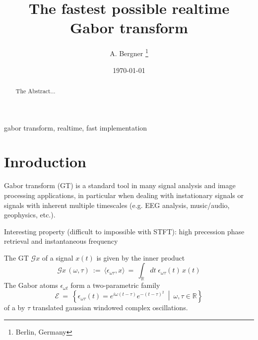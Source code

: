\documentclass[journal]{IEEEtran}
\begin{document}
\title {The fastest possible realtime Gabor transform}
\author{A. Bergner \thanks{Berlin, Germany} }
\date  {\today}
\maketitle




\begin{abstract}

The Abstract...

\end{abstract}

\begin{IEEEkeywords}
  gabor transform, realtime, fast implementation
\end{IEEEkeywords}





  \section{Inroduction}
  \label{sec:intro}


 Gabor transform (GT) is a standard tool in many signal
analysis and image processing applications, in particular when dealing with
instationary signals or signals with inherent multiple timescales (e.g. EEG
analysis, music/audio, geophysics, etc.).

Interesting property (difficult to impossible with STFT):  high precession phase retrieval and instantaneous frequency



The GT $\mathcal{G}x$ of a signal $x(t)$ is given by the inner product
\begin{equation} \label{def:GT}
  \mathcal{G}x\,(\omega,\tau) \ := \ \langle \epsilon_{\omega\tau} , x \rangle
    \ = \ \int_{\mathbb R}\!\! dt \; \epsilon_{\omega\tau} (t)\, x(t)
\end{equation}
The Gabor atoms $\epsilon_{\omega t}$ form a two-parametric family
\begin{equation}
  \mathcal{E} \ = \ \left\{ \epsilon_{\omega\tau}(t) =  e^{i\omega (t-\tau)} e^{-(t-\tau)^2}
                      \ \middle| \   \omega,\tau \in \mathbb{R} \right\}
\end{equation}
of a by $\tau$ translated gaussian windowed complex oscillations.
\end{document}
